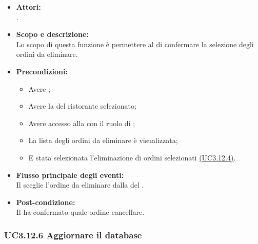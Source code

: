 \begin{itemize}
	\item \textbf{Attori:}
	\\.
	\item \textbf{Scopo e descrizione:} 
	\\Lo scopo di questa funzione è permettere al  di confermare la selezione degli ordini da eliminare.
	\item \textbf{Precondizioni:}
	\begin{itemize}
		\item Avere ;
		\item Avere la  del ristorante selezionato;
		\item Avere accesso alla  con il ruolo di ;
		\item La lista degli ordini da eliminare è visualizzata;
		\item E stata selezionata l'eliminazione di ordini selezionati \hyperref[UC3.12.4]{(UC3.12.4)}.
	\end{itemize}
	\item \textbf{Flusso principale degli eventi:}
	\\Il {} sceglie l'ordine da eliminare dalla  del .
	\item \textbf{Post-condizione:}
	\\Il {} ha confermato quale ordine cancellare.
\end{itemize}

\subsubsection{UC3.12.6 Aggiornare il database} \label{UC3.12.6}

